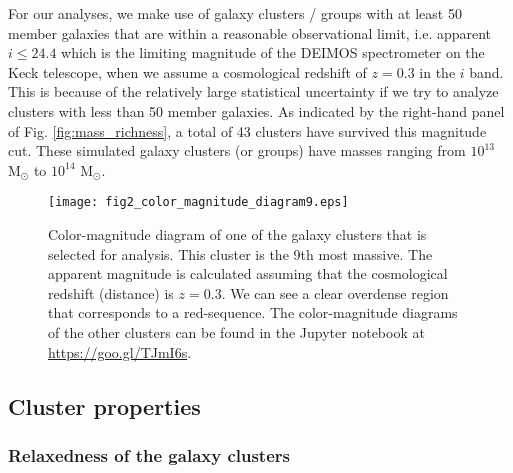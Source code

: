 For our analyses, we make use of galaxy clusters / groups 
with at least 50 member galaxies that are within a reasonable observational limit, 
i.e. apparent $i \leq 24.4$ which is the limiting magnitude of the DEIMOS
spectrometer on the Keck telescope, when we assume a cosmological redshift of $z = 0.3$
in the $i$ band. 
This is because of the relatively large statistical uncertainty if we try
to analyze clusters with less than 50 member galaxies. 
As indicated by the right-hand panel of Fig. \ref{fig:mass_richness}, 
a total of 43 clusters have 
survived this magnitude cut. These simulated galaxy clusters (or groups) have 
masses ranging from $10^{13}$ M$_\odot $ to $10^{14}$ M$_\odot$.  

\begin{figure}
	\centering
	\texttt{[image: fig2\_color\_magnitude\_diagram9.eps]}
	\caption{Color-magnitude diagram of one of the galaxy clusters that is selected for 
		analysis. This cluster is the 9th most massive. 
		The apparent magnitude is calculated assuming that 
		the cosmological redshift (distance) is $z = 0.3$. 
		We can see a clear overdense region that corresponds to a red-sequence.
		The color-magnitude diagrams of the other clusters can be found in the
		Jupyter notebook at \href{https://github.com/karenyyng/galaxy_DM_offset/blob/master/code/analyses/fig2_color_magnitude_diagram.ipynb}{https://goo.gl/TJmI6s}.
		\label{fig:color_magnitude_diagram}
	} 
\end{figure}

\subsection{Cluster properties}
\label{subsec:cluster_properties}
\subsubsection{Relaxedness of the galaxy clusters}
\label{subsubsec:relaxedness}


